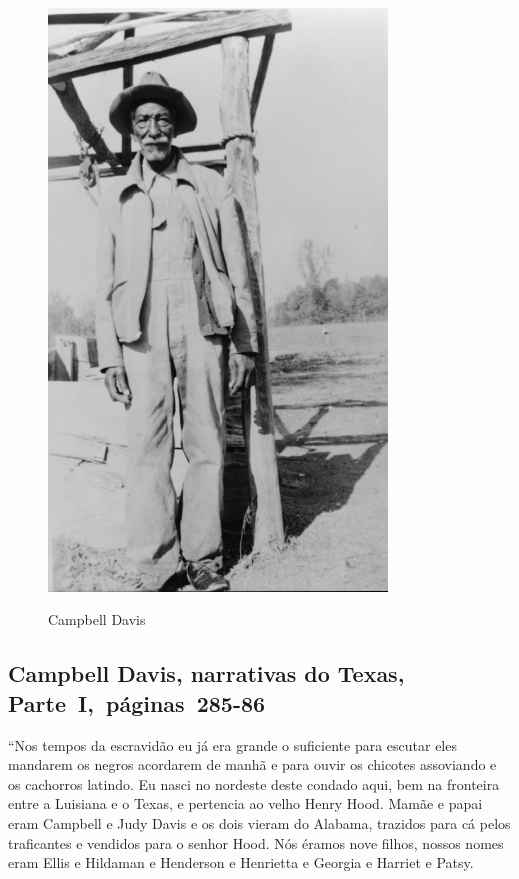 \pagebreak
\thispagestyle{empty}
\begin{figure}[!ht]
\centering
 \includegraphics[width=90mm]{./imgs/campbelldavis_recorte.jpg} \label{img6}
\caption{Campbell Davis}
\end{figure}	

\subsection{Campbell Davis, narrativas do Texas, Parte~I,~páginas~285-86} \label{ref68}

``Nos tempos da escravidão eu já era grande o suficiente para escutar
eles mandarem os negros acordarem de manhã e para ouvir os chicotes
assoviando e os cachorros latindo. Eu nasci no nordeste deste condado
aqui, bem na fronteira entre a Luisiana e o Texas, e pertencia ao velho
Henry Hood. Mamãe e papai eram Campbell e Judy Davis e os dois vieram do
Alabama, trazidos para cá pelos traficantes e vendidos para o senhor
Hood. Nós éramos nove filhos, nossos nomes eram Ellis e Hildaman e
Henderson e Henrietta e Georgia e Harriet e Patsy.

